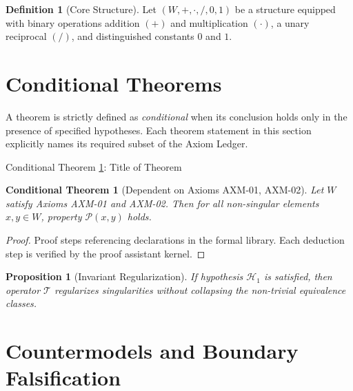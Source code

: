 \documentclass[11pt,a4paper]{article}
\theoremstyle{plain}
\newtheorem{conditionaltheorem}[theorem]{Conditional Theorem}
\newtheorem{proposition}[theorem]{Proposition}
\theoremstyle{definition}
\newtheorem{definition}[theorem]{Definition}
\theoremstyle{remark}
\begin{document}
\begin{definition}[Core Structure]
\label{def:structure}
Let $(W, +, \cdot, /, 0, 1)$ be a structure equipped with binary operations addition $(+)$ and multiplication $(\cdot)$, a unary reciprocal $(/)$, and distinguished constants $0$ and $1$.
\end{definition}

\section{Conditional Theorems}
\label{sec:conditional-theorems}

A theorem is strictly defined as \textit{conditional} when its conclusion holds only in the presence of specified hypotheses. Each theorem statement in this section explicitly names its required subset of the Axiom Ledger.

\begin{claimbox}{Conditional Theorem \ref{thm:sample-conditional}: Title of Theorem}
\begin{conditionaltheorem}[Dependent on Axioms AXM-01, AXM-02]
\label{thm:sample-conditional}
Let $W$ satisfy Axioms AXM-01 and AXM-02. Then for all non-singular elements $x, y \in W$, property $\mathcal{P}(x, y)$ holds.
\end{conditionaltheorem}
\end{claimbox}

\begin{proof}
Proof steps referencing declarations in the formal library. Each deduction step is verified by the proof assistant kernel.
\end{proof}

\begin{proposition}[Invariant Regularization]
\label{prop:regularization}
If hypothesis $\mathcal{H}_1$ is satisfied, then operator $\mathcal{T}$ regularizes singularities without collapsing the non-trivial equivalence classes.
\end{proposition}

\section{Countermodels and Boundary Falsification}
\label{sec:countermodels}
\end{document}
